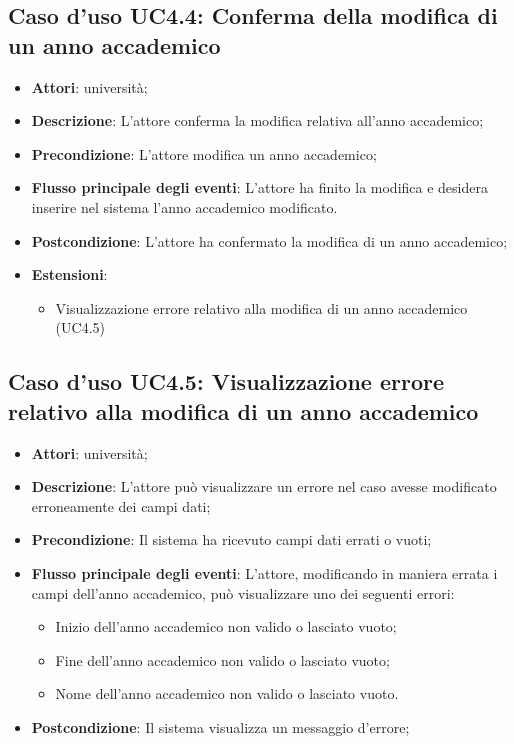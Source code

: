 \subsection{Caso d'uso \texorpdfstring{UC4.4}{UC4.4}: Conferma della modifica di un anno accademico}
\begin{itemize}
\item \textbf{Attori}: università;
\item \textbf{Descrizione}: L'attore conferma la modifica relativa all'anno accademico;
\item \textbf{Precondizione}: L'attore modifica un anno accademico;
\item \textbf{Flusso principale degli eventi}: L'attore ha finito la modifica e desidera inserire nel sistema l'anno accademico modificato.
\item \textbf{Postcondizione}: L'attore ha confermato la modifica di un anno accademico;
\item \textbf{Estensioni}:
\begin{itemize}
\item Visualizzazione errore relativo alla modifica di un anno accademico (UC4.5)
\end{itemize}
\end{itemize}
\subsection{Caso d'uso \texorpdfstring{UC4.5}{UC4.5}: Visualizzazione errore relativo alla modifica di un anno accademico}
\begin{itemize}
\item \textbf{Attori}: università;
\item \textbf{Descrizione}: L'attore può visualizzare un errore nel caso avesse modificato erroneamente dei campi dati;
\item \textbf{Precondizione}: Il sistema ha ricevuto campi dati errati o vuoti;
\item \textbf{Flusso principale degli eventi}: L'attore, modificando in maniera errata i campi dell'anno accademico, può visualizzare uno dei seguenti errori: 
\begin{itemize} \item Inizio dell'anno accademico non valido o lasciato vuoto; \item Fine dell'anno accademico non valido o lasciato vuoto; \item Nome dell'anno accademico non valido o lasciato vuoto. \end{itemize}
\item \textbf{Postcondizione}: Il sistema visualizza un messaggio d'errore;
\end{itemize}
